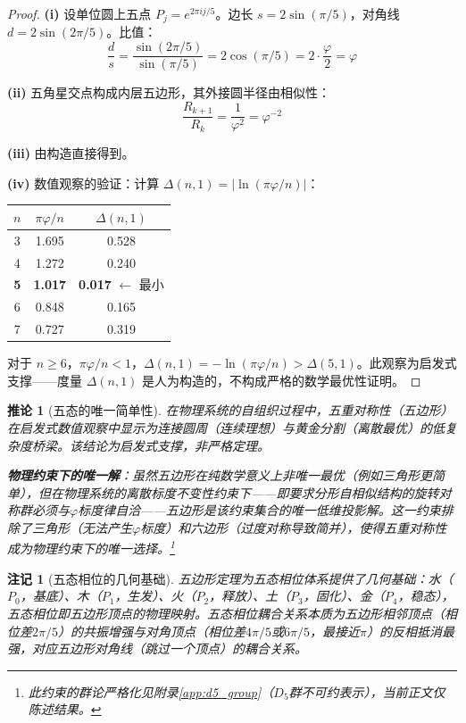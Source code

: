 \documentclass[12pt,a4paper,twocolumn]{article}
\renewcommand{\phi}{\varphi}
\newtheorem{corollary}[theorem]{推论}
\newtheorem{remark}[theorem]{注记}
\begin{document}
\begin{proof}
\textbf{(i)} 设单位圆上五点 $P_j = e^{2\pi i j/5}$。边长 $s = 2\sin(\pi/5)$，对角线 $d = 2\sin(2\pi/5)$。比值：
\begin{equation}
\frac{d}{s} = \frac{\sin(2\pi/5)}{\sin(\pi/5)} = 2\cos(\pi/5) = 2 \cdot \frac{\phi}{2} = \phi
\end{equation}

\textbf{(ii)} 五角星交点构成内层五边形，其外接圆半径由相似性：
\begin{equation}
\frac{R_{k+1}}{R_k} = \frac{1}{\phi^2} = \phi^{-2}
\end{equation}

\textbf{(iii)} 由构造直接得到。

\textbf{(iv)} 数值观察的验证：计算 $\Delta(n,1) = |\ln(\pi\phi/n)|$：
\begin{center}
\begin{tabular}{c|c|c}
$n$ & $\pi\phi/n$ & $\Delta(n,1)$ \\
\hline
3 & 1.695 & 0.528 \\
4 & 1.272 & 0.240 \\
\textbf{5} & \textbf{1.017} & \textbf{0.017} $\leftarrow$ 最小 \\
6 & 0.848 & 0.165 \\
7 & 0.727 & 0.319 \\
\end{tabular}
\end{center}
对于 $n \geq 6$，$\pi\phi/n < 1$，$\Delta(n,1) = -\ln(\pi\phi/n) > \Delta(5,1)$。此观察为启发式支撑——度量 $\Delta(n,1)$ 是人为构造的，不构成严格的数学最优性证明。
\end{proof}

\begin{corollary}[五态的唯一简单性]
在物理系统的自组织过程中，五重对称性（五边形）在启发式数值观察中显示为连接圆周（连续理想）与黄金分割（离散最优）的低复杂度桥梁。该结论为启发式支撑，非严格定理。

\textbf{物理约束下的唯一解}：虽然五边形在纯数学意义上非唯一最优（例如三角形更简单），但在物理系统的离散标度不变性约束下——即要求分形自相似结构的旋转对称群必须与$\phi$标度律自洽——五边形是该约束集合的唯一低维投影解。这一约束排除了三角形（无法产生$\phi$标度）和六边形（过度对称导致简并），使得五重对称性成为物理约束下的唯一选择。\footnote{此约束的群论严格化见附录\ref{app:d5_group}（$D_5$群不可约表示），当前正文仅陈述结果。}
\end{corollary}

\begin{remark}[五态相位的几何基础]
五边形定理为五态相位体系提供了几何基础：水（$P_0$，基底）、木（$P_1$，生发）、火（$P_2$，释放）、土（$P_3$，固化）、金（$P_4$，稳态），五态相位即五边形顶点的物理映射。五态相位耦合关系本质为五边形相邻顶点（相位差$2\pi/5$）的共振增强与对角顶点（相位差$4\pi/5$或$6\pi/5$，最接近$\pi$）的反相抵消最强，对应五边形对角线（跳过一个顶点）的耦合关系。
\end{remark}
\end{document}
